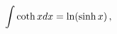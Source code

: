 \[\int\mathop{\coth\/}\nolimits xdx=\mathop{\ln\/}\nolimits\!\left(\mathop{\sinh%
\/}\nolimits x\right),\]